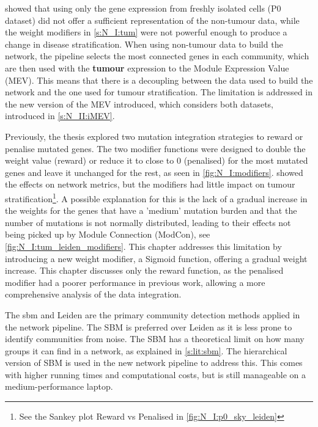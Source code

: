  showed that using only the gene expression from freshly isolated cells (P0 dataset) did not offer a sufficient representation of the non-tumour data, while the weight modifiers in \cref{s:N_I:tum} were not powerful enough to produce a change in disease stratification. When using non-tumour data to build the network, the pipeline selects the most connected genes in each community, which are then used with the \textbf{tumour} expression to the Module Expression Value (MEV). This means that there is a decoupling between the data used to build the network and the one used for tumour stratification. The limitation is addressed in the new version of the MEV introduced, which considers both datasets, introduced in \cref{s:N_II:iMEV}.


Previously, the thesis explored two mutation integration strategies to reward or penalise mutated genes. The two modifier functions were designed to double the weight value (reward) or reduce it to close to 0 (penalised) for the most mutated genes and leave it unchanged for the rest, as seen in \cref{fig:N_I:modifiers}.  showed the effects on network metrics, but the modifiers had little impact on tumour stratification\footnote{See the Sankey plot Reward vs Penalised in \cref{fig:N_I:p0_sky_leiden}}. A possible explanation for this is the lack of a gradual increase in the weights for the genes that have a 'medium' mutation burden and that the number of mutations is not normally distributed, leading to their effects not being picked up by Module Connection (ModCon), see \cref{fig:N_I:tum_leiden_modifiers}. This chapter addresses this limitation by introducing a new weight modifier, a Sigmoid function, offering a gradual weight increase. This chapter discusses only the reward function, as the penalised modifier had a poorer performance in previous work, allowing a more comprehensive analysis of the data integration.


The \acrfull{sbm} and Leiden are the primary community detection methods applied in the network pipeline. The SBM is preferred over Leiden as it is less prone to identify communities from noise. The SBM has a theoretical limit on how many groups it can find in a network, as explained in \cref{s:lit:sbm}. The hierarchical version of SBM is used in the new network pipeline to address this. This comes with higher running times and computational costs, but is still manageable on a medium-performance laptop.

